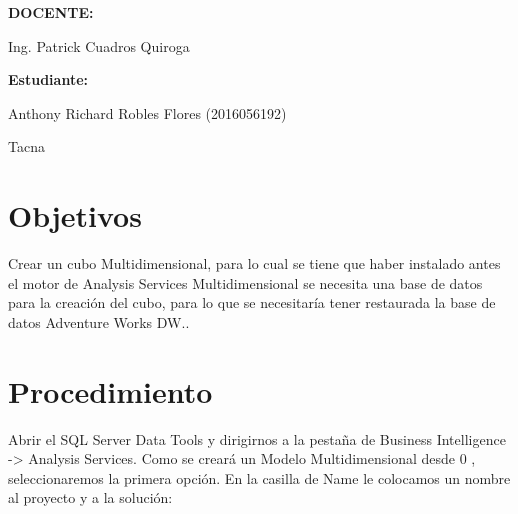 \documentclass[12pt,letterpaper]{article}
\begin{document}
\begin{titlepage}
\begin{center}
\vspace*{0.3in}
\begin{Large}
\textbf{DOCENTE:} \\
\end{Large}

\vspace*{0.1in}
\begin{large}
 Ing. Patrick Cuadros Quiroga\\
\end{large}

\vspace*{0.4in}
\vspace*{0.1in}
\begin{large}
\textbf{Estudiante:} \\
\begin{flushleft}
Anthony Richard Robles Flores  \hfill	(2016056192)\\

\centering  %
\vspace*{0.9in}
\begin{large}
Tacna\\ 
\end{large}

\end{flushleft}
\end{large}
\end{center}

\end{titlepage}


\tableofcontents %
\thispagestyle{empty} %
\newpage
\setcounter{page}{1} %

\section{Objetivos}
Crear un cubo Multidimensional, para lo cual se tiene que haber instalado antes el motor de Analysis
Services Multidimensional se necesita una base de datos para la creación del cubo, para lo que se
necesitaría tener restaurada la base de datos Adventure Works DW..

\section{Procedimiento}

Abrir el SQL Server Data Tools y dirigirnos a la pestaña de Business Intelligence -> Analysis
Services. Como se creará un Modelo Multidimensional desde 0 , seleccionaremos la primera opción. En la
casilla de Name le colocamos un nombre al proyecto y a la solución:







\end{document}
